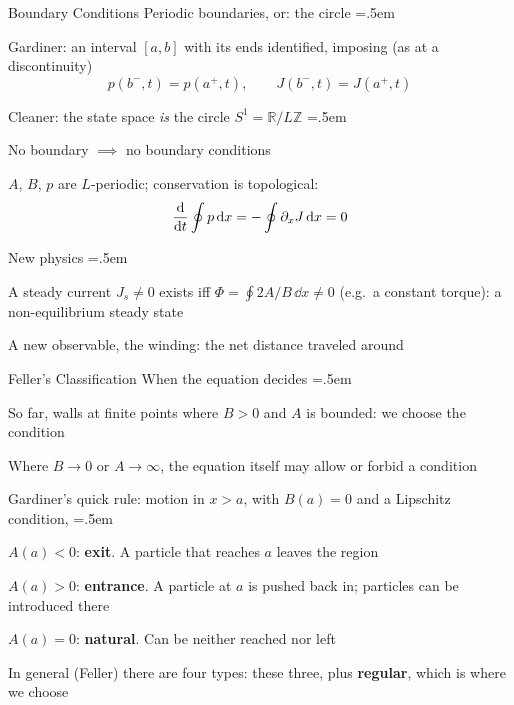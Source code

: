 \documentclass[xcolor={dvipsnames},t]{beamer}
\let\olditemize=\itemize
\let\endolditemize=\enditemize
\renewenvironment{itemize}{\olditemize \itemsep=.5em }{\endolditemize}
\begin{document}
\begin{frame}{Boundary Conditions}
    \alert{Periodic boundaries, or: the circle}
    \begin{itemize}
        \item<2-> Gardiner: an interval $[a,b]$ with its ends identified, imposing (as at a discontinuity)
        \[ p(b^-,t)=p(a^+,t),\qquad J(b^-,t)=J(a^+,t) \]
        \vspace{-1.5em}
        \item<3-> Cleaner: the state space \textit{is} the circle $S^1=\mathbb R/L\mathbb Z$
        \begin{itemize}
            \item<4-> No boundary $\implies$ no boundary conditions
            \item<5-> $A$, $B$, $p$ are $L$-periodic; conservation is topological:
            \[ \dv{t}\oint p\,\dd x=-\oint\partial_xJ\,\dd x=0 \]
        \end{itemize}
        \vspace{-1em}
        \item<6-> New physics
        \begin{itemize}
            \item<7-> A steady current $J_s\neq0$ exists iff $\Phi=\oint 2A/B\,\dd x\neq0$ (e.g.\ a constant torque): a non-equilibrium steady state
            \item<8-> A new observable, the winding: the net distance traveled around
        \end{itemize}
    \end{itemize}
\end{frame}

\begin{frame}{Feller's Classification}
    \alert{When the equation decides}
    \begin{itemize}
        \item<2-> So far, walls at finite points where $B>0$ and $A$ is bounded: we choose the condition
        \item<3-> Where $B\to0$ or $A\to\infty$, the equation itself may allow or forbid a condition
        \item<4-> Gardiner's quick rule: motion in $x>a$, with $B(a)=0$ and a Lipschitz condition,
        \begin{itemize}
            \item<5-> $A(a)<0$: \textbf{exit}. A particle that reaches $a$ leaves the region
            \item<6-> $A(a)>0$: \textbf{entrance}. A particle at $a$ is pushed back in; particles can be introduced there
            \item<7-> $A(a)=0$: \textbf{natural}. Can be neither reached nor left
        \end{itemize}
        \item<8-> In general (Feller) there are four types: these three, plus \textbf{regular}, which is where we choose
    \end{itemize}
\end{frame}
\end{document}
